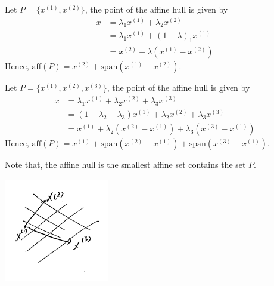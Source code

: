 \begin{example}
Let $P = \{x^{(1)}, x^{(2)} \}$, the point of the affine hull is given by
\begin{align*}
x 
&= \lambda_1x^{(1)} + \lambda_2x^{(2)}\\
&= \lambda_1x^{(1)} + (1-\lambda)_1x^{(1)}\\
&= x^{(2)} + \lambda(x^{(1)} - x^{(2)})
\end{align*}
Hence, $\text{aff}(P) = x^{(2)} + \text{span}(x^{(1)} - x^{(2)})$.

\vspace{0.3cm}
Let $P = \{x^{(1)}, x^{(2)}, x^{(3)} \}$, the point of the affine hull is given by
\begin{align*}
x 
&= \lambda_1x^{(1)} + \lambda_2x^{(2)} + \lambda_3x^{(3)}\\
&= (1 - \lambda_2 - \lambda_3)x^{(1)} + \lambda_2x^{(2)} + \lambda_3x^{(3)}\\
&= x^{(1)} + \lambda_2(x^{(2)} - x^{(1)}) + \lambda_3(x^{(3)} - x^{(1)})
\end{align*}
Hence,  $\text{aff}(P) = x^{(1)} + \text{span}(x^{(2)} - x^{(1)}) + \text{span}(x^{(3)} - x^{(1)})$.

Note that, the affine hull is the smallest affine set contains the set $P$.

\begin{marginfigure}
	\centering
	\includegraphics[width=1.8in,height=1.8in]{figures/ch08/figure1023_1.png}
\end{marginfigure}

\end{example}



